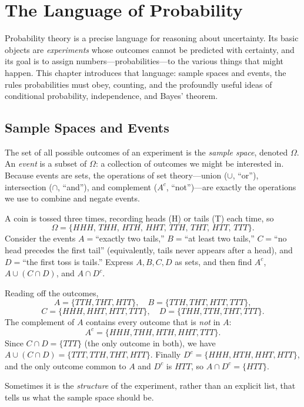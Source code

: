 \chapter{The Language of Probability}
\label{ch:probability}

Probability theory is a precise language for reasoning about uncertainty. Its
basic objects are \emph{experiments} whose outcomes cannot be predicted with
certainty, and its goal is to assign numbers—probabilities—to the various
things that might happen. This chapter introduces that language: sample
spaces and events, the rules probabilities must obey, counting, and the
profoundly useful ideas of conditional probability, independence, and Bayes'
theorem.

\section{Sample Spaces and Events}

The set of all possible outcomes of an experiment is the \emph{sample space},
denoted $\Omega$. An \emph{event} is a subset of $\Omega$: a collection of
outcomes we might be interested in. Because events are sets, the operations of
set theory—union ($\cup$, ``or''), intersection ($\cap$, ``and''), and
complement ($A^c$, ``not'')—are exactly the operations we use to combine and
negate events.

\begin{example}
A coin is tossed three times, recording heads (H) or tails (T) each time, so
\[
  \Omega = \{HHH,\,THH,\,HTH,\,HHT,\,TTH,\,THT,\,HTT,\,TTT\}.
\]
Consider the events
$A=$``exactly two tails,''
$B=$``at least two tails,''
$C=$``no head precedes the first tail'' (equivalently, tails never appears
after a head),
and $D=$``the first toss is tails.''
Express $A,B,C,D$ as sets, and then find $A^c$, $A\cup(C\cap D)$, and
$A\cap D^c$.

\solution Reading off the outcomes,
\[
  A=\{TTH,THT,HTT\},\quad
  B=\{TTH,THT,HTT,TTT\},
\]
\[
  C=\{HHH,HHT,HTT,TTT\},\quad
  D=\{THH,TTH,THT,TTT\}.
\]
The complement of $A$ contains every outcome that is \emph{not} in $A$:
\[
  A^c=\{HHH,THH,HTH,HHT,TTT\}.
\]
Since $C\cap D=\{TTT\}$ (the only outcome in both), we have
$A\cup(C\cap D)=\{TTT,TTH,THT,HTT\}$. Finally $D^c=\{HHH,HTH,HHT,HTT\}$, and the
only outcome common to $A$ and $D^c$ is $HTT$, so $A\cap D^c=\{HTT\}$.
\end{example}

Sometimes it is the \emph{structure} of the experiment, rather than an explicit
list, that tells us what the sample space should be.

